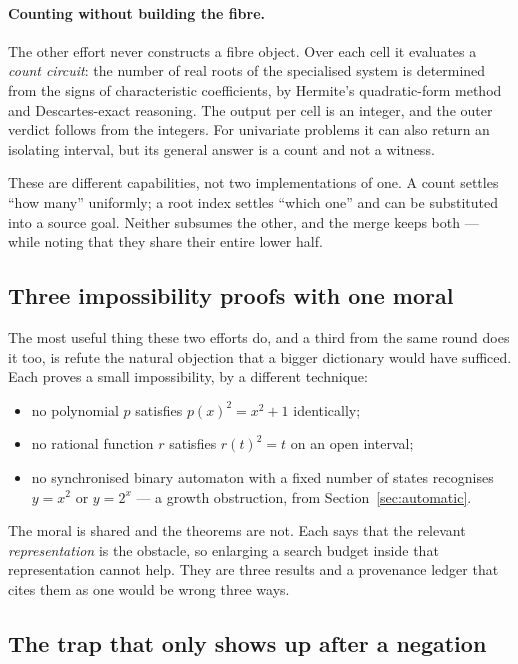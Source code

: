 \paragraph{Counting without building the fibre.} The other effort never
constructs a fibre object. Over each cell it evaluates a \emph{count circuit}:
the number of real roots of the specialised system is determined from the signs
of characteristic coefficients, by Hermite's quadratic-form method and
Descartes-exact reasoning. The output per cell is an integer, and the outer
verdict follows from the integers. For univariate problems it can also return
an isolating interval, but its general answer is a count and not a witness.

These are different capabilities, not two implementations of one. A count
settles ``how many'' uniformly; a root index settles ``which one'' and can be
substituted into a source goal. Neither subsumes the other, and the merge keeps
both --- while noting that they share their entire lower half.

\subsection{Three impossibility proofs with one moral}

The most useful thing these two efforts do, and a third from the same round
does it too, is refute the natural objection that a bigger dictionary would
have sufficed. Each proves a small impossibility, by a different technique:

\begin{itemize}[leftmargin=1.4em]
\item no polynomial $p$ satisfies $p(x)^2=x^2+1$ identically;
\item no rational function $r$ satisfies $r(t)^2=t$ on an open interval;
\item no synchronised binary automaton with a fixed number of states
  recognises $y=x^2$ or $y=2^x$ --- a growth obstruction, from
  Section~\ref{sec:automatic}.
\end{itemize}

The moral is shared and the theorems are not. Each says that the relevant
\emph{representation} is the obstacle, so enlarging a search budget inside that
representation cannot help. They are three results and a provenance ledger that
cites them as one would be wrong three ways.

\subsection{The trap that only shows up after a negation}

